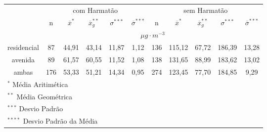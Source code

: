 \begin{tabular}{cccccc|ccccc}
  \hline
  &  \multicolumn{5}{c|}{com Harmatão} & \multicolumn{5}{c}{sem Harmatão} \\
 & n & $\overline{x}^*$ & $\overline{x}_g^{**}$ & $\sigma^{***}$ & $\overline{\sigma}^{***}$
 & n & $\overline{x}^*$ & $\overline{x}_g^{**}$ & $\sigma^{***}$ & $\overline{\sigma}^{***}$ \\
                       \hline & \multicolumn{10}{c}{$\mu g \cdot m^{-3}$} \\  \hline
residencial & 87 & 44,91 & 43,14 & 11,87 & 1,12 & 136 & 115,12 & 67,72 & 186,39 & 13,28 \\ 
  avenida & 89 & 61,57 & 60,55 & 11,52 & 1,08 & 138 & 131,65 & 88,99 & 183,62 & 13,02 \\ 
  ambas & 176 & 53,33 & 51,21 & 14,34 & 0,95 & 274 & 123,45 & 77,70 & 184,85 & 9,29 \\ 
   \hline
\multicolumn{11}{l}{$^{*}$ Média Aritimética} \\
\multicolumn{11}{l}{$^{**}$ Média Geométrica} \\
\multicolumn{11}{l}{$^{***}$ Desvio Padrão} \\
\multicolumn{11}{l}{$^{****}$ Desvio Padrão da Média} \\
   \hline
\end{tabular}
